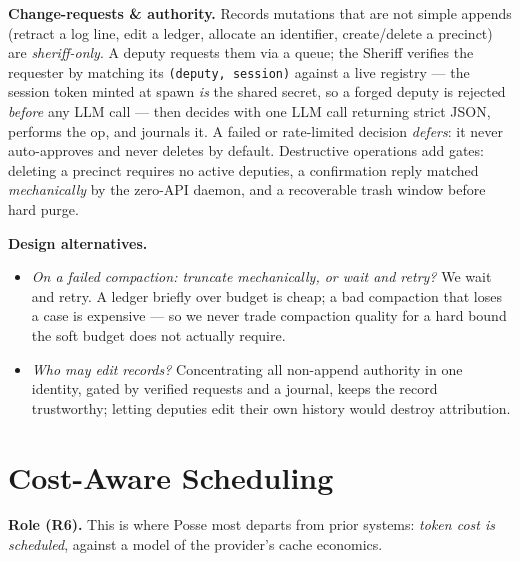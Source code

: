 \documentclass[10pt,twocolumn]{article}
\newcommand{\code}[1]{\texttt{\small #1}}
\begin{document}
\noindent\textbf{Change-requests \& authority.} Records mutations that are not simple
appends (retract a log line, edit a ledger, allocate an identifier, create/delete a
precinct) are \emph{sheriff-only}. A deputy requests them via a queue; the Sheriff
verifies the requester by matching its \code{(deputy, session)} against a live registry
--- the session token minted at spawn \emph{is} the shared secret, so a forged deputy is
rejected \emph{before} any LLM call --- then decides with one LLM call returning strict
JSON, performs the op, and journals it. A failed or rate-limited decision \emph{defers}:
it never auto-approves and never deletes by default. Destructive operations add gates:
deleting a precinct requires no active deputies, a confirmation reply matched
\emph{mechanically} by the zero-API daemon, and a recoverable trash window before hard
purge.

\noindent\textbf{Design alternatives.}
\begin{itemize}[leftmargin=1.1em,itemsep=1pt,topsep=2pt]
  \item \emph{On a failed compaction: truncate mechanically, or wait and retry?} We wait
  and retry. A ledger briefly over budget is cheap; a bad compaction that loses a case is
  expensive --- so we never trade compaction quality for a hard bound the soft budget
  does not actually require.
  \item \emph{Who may edit records?} Concentrating all non-append authority in one
  identity, gated by verified requests and a journal, keeps the record trustworthy;
  letting deputies edit their own history would destroy attribution.
\end{itemize}

\section{Cost-Aware Scheduling}
\label{sec:cost}
\textbf{Role (R6).} This is where Posse most departs from prior systems: \emph{token
cost is scheduled}, against a model of the provider's cache economics.
\end{document}
